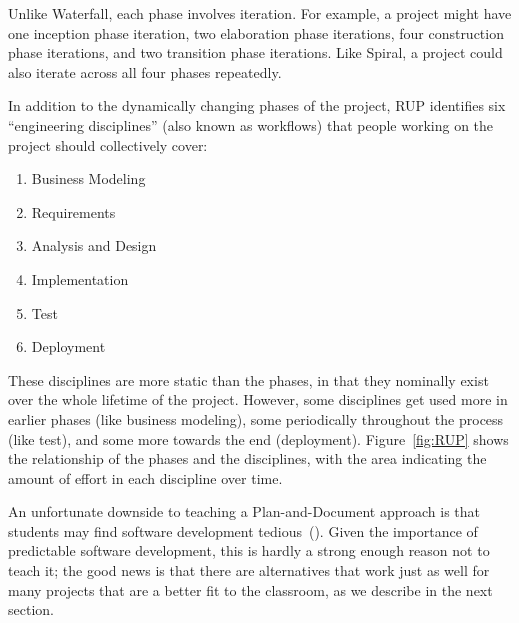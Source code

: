 Unlike Waterfall, each phase involves iteration. For example, a project might have one inception phase iteration, two elaboration phase iterations, four construction phase iterations, and two transition phase iterations. Like Spiral, a project could also iterate across all four phases repeatedly.

In addition to the dynamically changing phases of the project, RUP
identifies six ``engineering disciplines''
(also known as workflows) that people working on the project should
  collectively cover:

\begin{enumerate}
\item    Business Modeling
\item    Requirements
\item    Analysis and Design
\item    Implementation
\item    Test
\item    Deployment
\end{enumerate}

These disciplines are more static than the phases, in that they nominally exist over the whole lifetime of the project. However, some disciplines get used more in earlier phases (like business modeling), some periodically throughout the process (like test), and some more towards the end (deployment).
Figure~\ref{fig:RUP} shows the relationship of the phases and the disciplines, with the area indicating the amount of effort in each discipline over time.



An unfortunate downside to teaching a Plan-and-Document approach is that students may find software development tedious~(\cite{Nawrocki02,Estler12}). Given the importance of predictable software development, this is hardly a strong enough reason not to teach it; the good news is that there are alternatives that work just as well for many projects that are a better fit to the classroom, as we describe in the next section.

